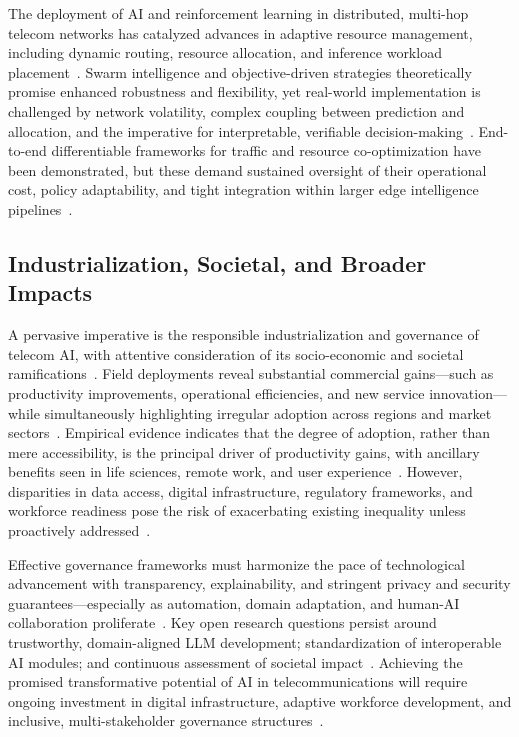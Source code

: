 The deployment of AI and reinforcement learning in distributed, multi-hop telecom networks has catalyzed advances in adaptive resource management, including dynamic routing, resource allocation, and inference workload placement~\cite{ref48}. Swarm intelligence and objective-driven strategies theoretically promise enhanced robustness and flexibility, yet real-world implementation is challenged by network volatility, complex coupling between prediction and allocation, and the imperative for interpretable, verifiable decision-making~\cite{ref48}. End-to-end differentiable frameworks for traffic and resource co-optimization have been demonstrated, but these demand sustained oversight of their operational cost, policy adaptability, and tight integration within larger edge intelligence pipelines~\cite{ref48}.

\subsection{Industrialization, Societal, and Broader Impacts}

A pervasive imperative is the responsible industrialization and governance of telecom AI, with attentive consideration of its socio-economic and societal ramifications~\cite{ref6, ref8, ref19, ref26, ref29, ref49}. Field deployments reveal substantial commercial gains—such as productivity improvements, operational efficiencies, and new service innovation—while simultaneously highlighting irregular adoption across regions and market sectors~\cite{ref6, ref8, ref29}. Empirical evidence indicates that the degree of adoption, rather than mere accessibility, is the principal driver of productivity gains, with ancillary benefits seen in life sciences, remote work, and user experience~\cite{ref6, ref19}. However, disparities in data access, digital infrastructure, regulatory frameworks, and workforce readiness pose the risk of exacerbating existing inequality unless proactively addressed~\cite{ref8, ref19}.

Effective governance frameworks must harmonize the pace of technological advancement with transparency, explainability, and stringent privacy and security guarantees—especially as automation, domain adaptation, and human-AI collaboration proliferate~\cite{ref19, ref26, ref49}. Key open research questions persist around trustworthy, domain-aligned LLM development; standardization of interoperable AI modules; and continuous assessment of societal impact~\cite{ref26, ref49}. Achieving the promised transformative potential of AI in telecommunications will require ongoing investment in digital infrastructure, adaptive workforce development, and inclusive, multi-stakeholder governance structures~\cite{ref8, ref26, ref29, ref49}.

